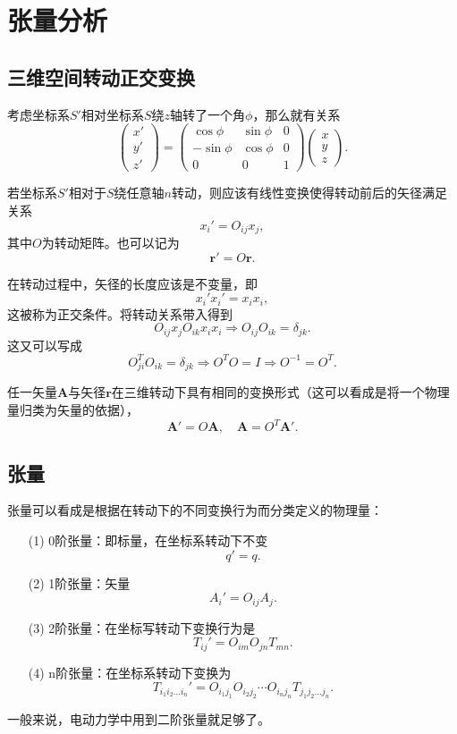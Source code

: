 \documentclass[UTF8]{ctexbook}
\renewcommand{\b}{\boldsymbol}
\numberwithin{equation}{chapter}
\begin{document}
	
	\section{张量分析}
	\subsection{三维空间转动\quad 正交变换}
	考虑坐标系$S'$相对坐标系$S$绕$z$轴转了一个角$\phi$，那么就有关系
	\[\begin{pmatrix} x' \\ y' \\ z'\end{pmatrix} = \begin{pmatrix} \cos\phi & \sin\phi & 0 \\ -\sin \phi & \cos\phi & 0 \\ 0 & 0 & 1\end{pmatrix} \begin{pmatrix} x \\ y \\ z\end{pmatrix}.\]
	
	若坐标系$S'$相对于$S$绕任意轴$n$转动，则应该有线性变换使得转动前后的矢径满足关系
	\[x_i'=O_{ij}x_j,\]
	其中$O$为转动矩阵。也可以记为
	\[\b{r}'=O\b{r}.\]
	
	在转动过程中，矢径的长度应该是不变量，即
	\[x_i'x_i'=x_ix_i,\]
	这被称为正交条件。将转动关系带入得到
	\[O_{ij}x_jO_{ik}x_ix_i \Rightarrow O_{ij}O_{ik}=\delta_{jk}.\]
	这又可以写成
	\[O_{ji}^T O_{ik}=\delta_{jk}\Rightarrow O^TO=I \Rightarrow O^{-1}=O^T.\]
	
	任一矢量$\b{A}$与矢径$\b{r}$在三维转动下具有相同的变换形式（这可以看成是将一个物理量归类为矢量的依据），
	\[\b{A}'= O\b{A},\quad \b{A}=O^T\b{A}'.\]
	
	\subsection{张量}
	张量可以看成是根据在转动下的不同变换行为而分类定义的物理量：
	\begin{itemize}
		\item[(1)]0阶张量：即标量，在坐标系转动下不变
		\[q'=q.\]
		\item[(2)]1阶张量：矢量
		\[A_i'=O_{ij}A_j.\]
		\item[(3)]2阶张量：在坐标写转动下变换行为是
		\[T_{ij}'=O_{im}O_{jn}T_{mn}.\]
		\item[(4)]n阶张量：在坐标系转动下变换为
		\[T_{i_1i_2\dots i_n}'=O_{i_1j_1}O_{i_2j_2}\cdots O_{i_n j_n}T_{j_1j_2\dots j_n}.\]
	
		 
	\end{itemize}
	一般来说，电动力学中用到二阶张量就足够了。
	
\end{document}
